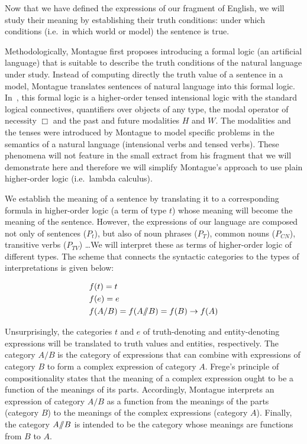 Now that we have defined the expressions of our fragment of English, we
will study their meaning by establishing their truth conditions: under
which conditions (i.e.\ in which world or model) the sentence is true.

Methodologically, Montague first proposes introducing a formal logic (an
artificial language) that is suitable to describe the truth conditions of
the natural language under study. Instead of computing directly the
truth value of a sentence in a model, Montague translates sentences of
natural language into this formal logic. In~\cite{montague1973proper}, this
formal logic is a higher-order tensed intensional logic with the standard
logical connectives, quantifiers over objects of any type, the modal
operator of necessity $\Box$ and the past and future modalities $H$ and
$W$. The modalities and the tenses were introduced by Montague to model
specific problems in the semantics of a natural language (intensional verbs
and tensed verbs). These phenomena will not feature in the small extract
from his fragment that we will demonstrate here and therefore we will
simplify Montague's approach to use plain higher-order logic (i.e.\ lambda
calculus).

We establish the meaning of a sentence by translating it to a corresponding
formula in higher-order logic (a term of type $t$) whose meaning will
become the meaning of the sentence. However, the expressions of our
language are composed not only of sentences ($P_t$), but also of noun
phrases ($P_T$), common nouns ($P_{CN}$), transitive verbs ($P_{TV}$)
\ldots We will interpret these as terms of higher-order logic of different
types. The scheme that connects the syntactic categories to the types of
interpretations is given below:

\begin{align*}
  &f(t) = t \\
  &f(e) = e \\
  &f(A / B) = f(A /\!\!/ B) = f(B) \to f(A)
\end{align*}

Unsurprisingly, the categories $t$ and $e$ of truth-denoting and
entity-denoting expressions will be translated to truth values and
entities, respectively. The category $A / B$ is the category of expressions
that can combine with expressions of category $B$ to form a complex
expression of category $A$. Frege's principle of compositionality states
that the meaning of a complex expression ought to be a function of the
meanings of its parts. Accordingly, Montague interprets an expression of
category $A / B$ as a function from the meanings of the parts (category
$B$) to the meanings of the complex expressions (category $A$). Finally,
the category $A /\!\!/ B$ is intended to be the category whose
meanings are functions from $B$ to $A$.

